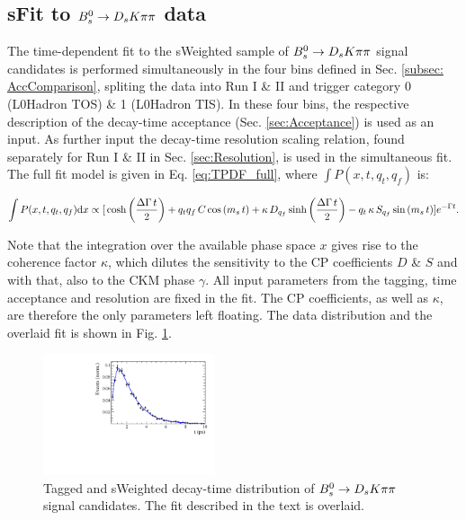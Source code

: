 

\clearpage
\subsection{sFit to ${{B}^0_{s}}\rightarrow{\ensuremath{{D}_{s}}}{\ensuremath{K}}{\ensuremath{\pi}}{\ensuremath{\pi}}$ data}
The time-dependent fit to the sWeighted sample of ${{B}^0_{s}}\rightarrow{\ensuremath{{D}_{s}}}{\ensuremath{K}}{\ensuremath{\pi}}{\ensuremath{\pi}}$ signal candidates is performed simultaneously in the four bins defined in Sec. \ref{subsec: AccComparison}, 
spliting the data into Run I \& II and trigger category 0 (L0Hadron TOS) \& 1 (L0Hadron TIS). 
In these four bins, the respective description of the decay-time acceptance (Sec. \ref{sec:Acceptance}) is used as an input. 
As further input the decay-time resolution scaling relation, found separately for Run I \& II in Sec. \ref{sec:Resolution}, is used in the simultaneous fit. 
The full fit model is given in Eq. \ref{eq:TPDF_full}, where $\int P(x,t,q_t,q_f)$ is: 

\begin{equation} 
           \int P(x,t,q_t,q_f) \text d x \propto    [
        \, \text{cosh} \left( \frac{\Delta \Gamma \, t}{2}\right) 
          + q_t q_f \, C \, \text{cos} \left( m_s \, t \right)  
          + \kappa \, D_{q_f} \, \text{sinh} \left( \frac{\Delta \Gamma \, t}{2}\right)  
          - q_t \, \kappa \, S_{q_f}\, \text{sin} \left( m_s \, t \right)  ]  e^{- \Gamma t}.
\end{equation}

Note that the integration over the available phase space $x$ gives rise to the coherence factor $\kappa$, which dilutes the sensitivity to the CP coefficients $D$ \& $S$ and with that, also to the CKM phase $\gamma$. 
All input parameters from the tagging, time acceptance and resolution are fixed in the fit. The CP coefficients, as well as $\kappa$, are therefore the only parameters left floating. 
The data distribution and the overlaid fit is shown in Fig. \ref{fig:tFitSig}.




\begin{figure}[h]
	\centering
		\includegraphics[width=0.45\textwidth, height = !]{figs/timeFit/signal/h_t.pdf} 
		\caption{Tagged and sWeighted decay-time distribution of ${{B}^0_{s}}\rightarrow{\ensuremath{{D}_{s}}}{\ensuremath{K}}{\ensuremath{\pi}}{\ensuremath{\pi}}$ signal candidates. The fit described in the text is overlaid.} 
		\label{fig:tFitSig}
\end{figure}	


